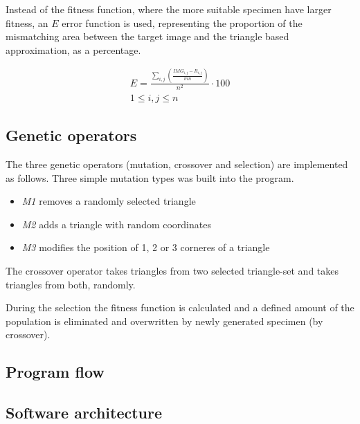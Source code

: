 \documentclass[conference]{IEEEtran}
\begin{document}
Instead of the fitness function, where the more suitable
specimen have larger fitness, an $E$ error function is used, representing
the proportion of the mismatching area between the target image and the triangle
based approximation, as a percentage.

\begin{equation}
	\begin{gathered}
		E = \frac{\sum_{i,j} \left( \frac{IMG_{i,j}-R_{i,j}}{mn} \right)}{n^2}\cdot 100\\
		1 \leq i,j \leq n
	\end{gathered}
\end{equation}

\subsection{Genetic operators}

The three genetic operators (mutation, crossover and selection)
are implemented as follows. Three simple mutation types was
built into the program.

\begin{itemize}

	\item{\emph{M1} removes a randomly selected triangle}

	\item{\emph{M2} adds a triangle with random coordinates}

	\item{\emph{M3} modifies the position of 1, 2 or 3 corneres of a triangle}

\end{itemize}

The crossover operator takes triangles from two selected triangle-set
and takes triangles from both, randomly.

During the selection the fitness function is calculated and a defined
amount of the population is eliminated and overwritten by
newly generated specimen (by crossover).

\subsection{Program flow}



\subsection{Software architecture}
\end{document}
